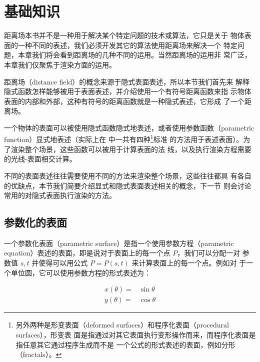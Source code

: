\section{基础知识}
距离场本书并不是一种用于解决某个特定问题的技术或算法，它只是关于 物体表面的一种不同的表述，我们必须开发其它的算法使用距离场来解决一个 特定问题，本章我们将会看到距离场的几种不同的运用。当然距离场的运用非 常广泛\cite{a:3d-distance-fields-a-survey}，本章我们仅聚焦于渲染方面的运用。

距离场（distance field）的概念来源于隐式表面表述，所以本节我们首先来 解释隐式函数怎样能够被用于表面表述，并介绍使用一个有符号距离函数来指 示物体表面的内部和外部，这种有符号的距离函数就是一种隐式表述，它形成 了一个距离场。

一个物体的表面可以被使用隐式函数隐式地表述，或者使用参数函数（parametric function）显式地表述（实际上在 \cite{b:AnIntegratedIntroductiontoCG}中一共有四种\footnote{另外两种是形变表面（deformed surfaces）和程序化表面（procedural surfaces），形变表 面是指通过对其它表面执行变形操作而来，而程序化表面是指任意其它通过程序生成而不是 一个公式的形式表述的表面，例如分形（fractals）。}标准 的方法用于表述表面）。为了渲染整个场景，这些函数可以被用于计算表面的法 线，以及执行渲染方程需要的光线-表面相交计算。

不同的表面表述往往需要使用不同的方法来渲染整个场景，这些往往都具 有各自的优缺点，本节我们简要介绍显式和隐式表面表述相关的概念，下一节 则会讨论常用的对隐式表面执行渲染的方法。



\subsection{参数化的表面}\label{sec:df-parametric-surface}
一个参数化表面（parametric surface）是指一个使用参数方程（parametric equation）表述的表面，即是说对于表面上的每一个点 $P$，我们可以分配一对 参数值 $s,t$ 并使得可以用公式 $P = P(s,t)$ 来计算表面上的每一个点。例如对 于一个单位圆，它可以使用参数方程的形式表述为：

\begin{equation}
	\begin{aligned}
		x(\theta)=&\sin \theta\\
		y(\theta)=&\cos \theta
	\end{aligned}
\end{equation}

